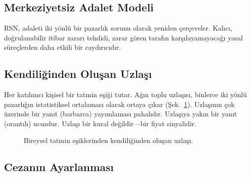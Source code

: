 \documentclass[11pt,a4paper,twocolumn]{article}
\begin{document}
\subsection{Merkeziyetsiz Adalet Modeli}

RSN, adaleti iki yönlü bir pazarlık sorunu olarak yeniden çerçeveler. Kalıcı, doğrulanabilir itibar zararı tehdidi, zarar gören tarafın karşılayamayacağı yasal süreçlerden daha etkili bir caydırıcıdır.

\subsection{Kendiliğinden Oluşan Uzlaşı}

Her katılımcı kişisel bir tatmin eşiği tutar. Ağın toplu uzlaşısı, binlerce iki yönlü pazarlığın istatistiksel ortalaması olarak ortaya çıkar (Şek.~\ref{fig:consensus}). Uzlaşının çok üzerinde bir yanıt (barbarca) yayımlaması pahalıdır. Uzlaşıya yakın bir yanıt (orantılı) ucuzdur. Uzlaşı bir kural değildir---bir fiyat sinyalidir.

\begin{figure}[ht]
\centering
{}
\caption{Bireysel tatmin eşiklerinden kendiliğinden oluşan uzlaşı.}
\label{fig:consensus}
\end{figure}

\subsection{Cezanın Ayarlanması}
\end{document}
